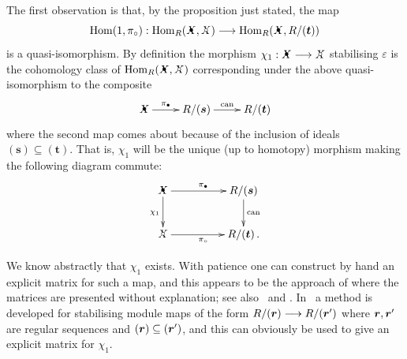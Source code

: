\documentclass{compositio}
\theoremstyle{definition}
\numberwithin{equation}{section}
\def\can{\operatorname{can}}
\def\Hom{\operatorname{Hom}}
\begin{document}
The first observation is that, by the proposition just stated, the map
\[
\Hom(1,\pi_{\circ}): \Hom_R(\Xbul, \Xcirc) \lto \Hom_R(\Xbul, R/(\boldsymbol{t}))
\]
is a quasi-isomorphism. By definition the morphism $\chi_1: \Xbul \lto \Xcirc$ stabilising $\varepsilon$ is the cohomology class of $\Hom_R(\Xbul, \Xcirc)$ corresponding under the above quasi-isomorphism to the composite
\begin{equation}\label{eq:cons4}
\xymatrix{
\Xbul \ar[r]^-{\pi_{\bullet}} & R/(\boldsymbol{s}) \ar[r]^-{\can} & R/(\boldsymbol{t})
}
\end{equation}
where the second map comes about because of the inclusion of ideals $(\boldsymbol{s}) \subseteq (\boldsymbol{t})$. That is, $\chi_1$ will be the unique (up to homotopy) morphism making the following diagram commute:
\begin{equation}\label{eq:cons5}
\xymatrix@C+2pc{
\Xbul \ar[d]_{\chi_1} \ar[r]^{\pi_{\bullet}} & R/(\boldsymbol{s}) \ar[d]^{\can}\\
\Xcirc \ar[r]_{\pi_{\circ}} & R/(\boldsymbol{t}) \, . 
}
\end{equation}

We know abstractly that $\chi_1$ exists. With patience one can construct by hand an explicit matrix for such a map, and this appears to be the approach of \cite{kr0401268} where the matrices are presented without explanation; see also~\cite[Section 2]{kr0505056} and \cite[Example 2.3.7]{b1105.0702}. In~\cite[Section 7.5]{w0907.0695} a method is developed for stabilising module maps of the form $R/(\boldsymbol{r}) \longrightarrow R/(\boldsymbol{r}')$ where $\boldsymbol{r},\boldsymbol{r}'$ are regular sequences and $(\boldsymbol{r}) \subseteq (\boldsymbol{r}')$, and this can obviously be used to give an explicit matrix for $\chi_1$.
\end{document}
